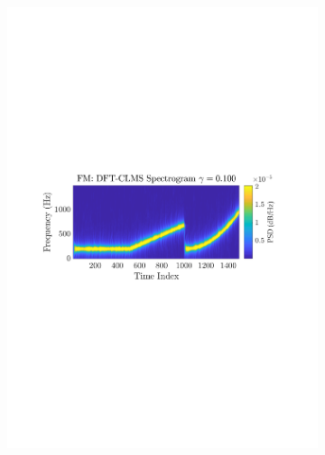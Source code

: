 \documentclass[12pt]{article}
\numberwithin{equation}{section}
\begin{document}
\begin{figure}[H]
				\begin{subfigure}{0.49\textwidth}
					\centering
					\includegraphics[trim={2.2cm 11.2cm 3.00cm  11.2cm}, clip, width=\textwidth]{../MATLAB/figures/q3_3c_fig04.pdf} 
					\captionsetup{justification=centering}
				\end{subfigure}
				\begin{subfigure}{0.49\textwidth}
					\centering

\end{subfigure}
\end{figure}
\end{document}
